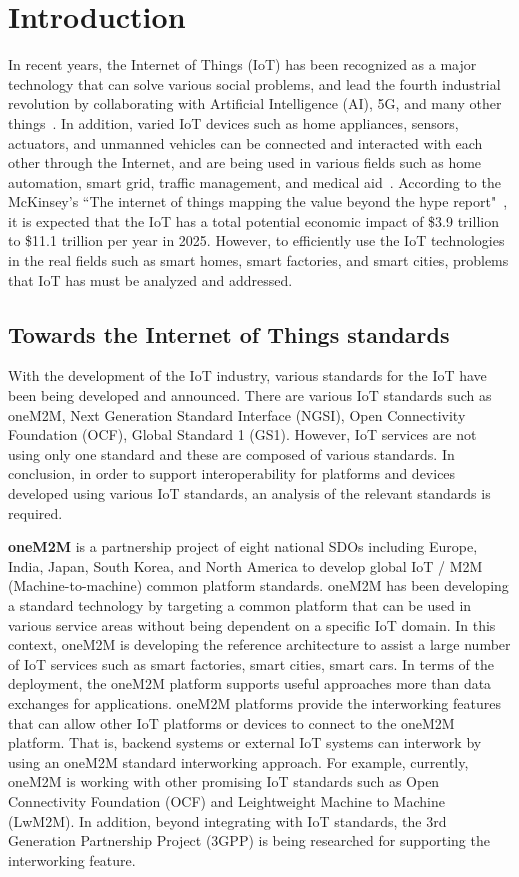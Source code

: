 \section{Introduction}
In recent years, the Internet of Things (IoT) has been recognized as a major technology that can solve various social problems, and lead the fourth industrial revolution by collaborating with Artificial Intelligence (AI), 5G, and many other things~\cite{ahlgren2016internet}. In addition, varied IoT devices such as home appliances, sensors, actuators, and unmanned vehicles can be connected and interacted with each other through the Internet, and are being used in various fields such as home automation, smart grid, traffic management, and medical aid~\cite{zanella2014internet}. According to the McKinsey's ``The internet of things mapping the value beyond the hype report"~\cite{manyika2015internet}, it is expected that the IoT has a total potential economic impact of \$3.9 trillion to \$11.1 trillion per year in 2025. However, to efficiently use the IoT technologies in the real fields such as smart homes, smart factories, and smart cities, problems that IoT has must be analyzed and addressed.

\subsection{Towards the Internet of Things standards}  
With the development of the IoT industry, various standards for the IoT have been being developed and announced. There are various IoT standards such as oneM2M, Next Generation Standard Interface (NGSI), Open Connectivity Foundation (OCF), Global Standard 1 (GS1). However, IoT services are not using only one standard and these are composed of various standards. In conclusion, in order to support interoperability for platforms and devices developed using various IoT standards, an analysis of the relevant standards is required.

\textbf{oneM2M} is a partnership project of eight national SDOs including Europe, India, Japan, South Korea, and North America to develop global IoT / M2M (Machine-to-machine) common platform standards. oneM2M has been developing a standard technology by targeting a common platform that can be used in various service areas without being dependent on a specific IoT domain. In this context, oneM2M is developing the reference architecture to assist a large number of IoT services such as smart factories, smart cities, smart cars. In terms of the deployment, the oneM2M platform supports useful approaches more than data exchanges for applications. oneM2M platforms provide the interworking features that can allow other IoT platforms or devices to connect to the oneM2M platform. That is, backend systems or external IoT systems can interwork by using an oneM2M standard interworking approach. For example, currently, oneM2M is working with other promising IoT standards such as Open Connectivity Foundation (OCF) and Leightweight Machine to Machine (LwM2M). In addition, beyond integrating with IoT standards, the 3rd Generation Partnership Project (3GPP) is being researched for supporting the interworking feature.

